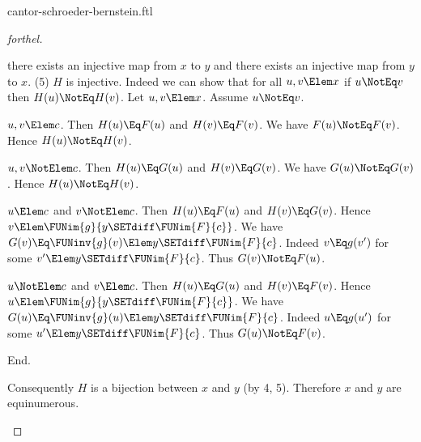\documentclass{stex}
\begin{document}
\begin{smodule}{cantor-schroeder-bernstein.ftl}
\begin{proof}[forthel]
\begin{case}{there exists an injective map from $x$ to $y$ and there exists an injective map from $y$ to $x$.}
    (5) $H$ is injective.
    Indeed we can show that for all $u, v \Elem x$ if $u \NotEq v$ then $H(u) \NotEq H(v)$.
      Let $u,v \Elem x$.
      Assume $u \NotEq v$.

      \begin{case}{$u,v \Elem c$.}
        Then $H(u) \Eq F(u)$ and $H(v) \Eq F(v)$.
        We have $F(u) \NotEq\linebreak F(v)$.
        Hence $H(u) \NotEq H(v)$.
      \end{case}

      \begin{case}{$u,v \NotElem c$.}
        Then $H(u) \Eq G(u)$ and $H(v) \Eq G(v)$.
        We have $G(u) \NotEq\linebreak G(v)$.
        Hence $H(u) \NotEq H(v)$.
      \end{case}

      \begin{case}{$u \Elem c$ and $v \NotElem c$.}
        Then $H(u) \Eq F(u)$ and $H(v) \Eq G(v)$.
        Hence $v \Elem \FUNim{g}{y \SETdiff \FUNim{F}{c}}$.
        We have $G(v) \Eq \FUNinv{g}(v) \Elem y \SETdiff \FUNim{F}{c}$.
        Indeed $v \Eq g(v')$ for some $v' \Elem y \SETdiff \FUNim{F}{c}$.
        Thus $G(v) \NotEq F(u)$.
      \end{case}

      \begin{case}{$u \NotElem c$ and $v \Elem c$.}
        Then $H(u) \Eq G(u)$ and $H(v) \Eq F(v)$.
        Hence $u \Elem \FUNim{g}{y \SETdiff \FUNim{F}{c}}$.
        We have $G(u) \Eq \FUNinv{g}(u) \Elem y \SETdiff \FUNim{F}{c}$.
        Indeed $u \Eq g(u')$ for some $u' \Elem y \SETdiff \FUNim{F}{c}$.
        Thus $G(u) \NotEq F(v)$.
      \end{case}
    End.

    Consequently $H$ is a bijection between $x$ and $y$ (by 4, 5).
    Therefore $x$ and $y$ are equinumerous.
  \end{case}
\end{proof}

\printbibliography
{}
\end{smodule}
\end{document}

